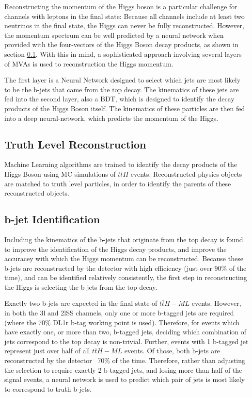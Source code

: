 Reconstructing the momentum of the Higgs boson is a particular challenge for channels with leptons in the final state: Because all channels include at least two neutrinos in the final state, the Higgs can never be fully reconstructed. However, the momentum spectrum can be well predicted by a neural network when provided with the four-vectors of the Higgs Boson decay products, as shown in section \ref{sec:truthLevelReco}. With this in mind, a sophisticated approach involving several layers of MVAs is used to reconstruction the Higgs momentum. 

The first layer is a Neural Network designed to select which jets are most likely to be the b-jets that came from the top decay. The kinematics of these jets are fed into the second layer, also a BDT, which is designed to identify the decay products of the Higgs Boson itself. The kinematics of these particles are then fed into a deep neural-network, which predicts the momentum of the Higgs.

\subsection{Truth Level Reconstruction}
\label{sec:truthLevelReco}

Machine Learning algorithms are trained to identify the decay products of the Higgs Boson using MC simulations of $t\bar{t}H$ events. Reconstructed physics objects are matched to truth level particles, in order to identify the parents of these reconstructed objects. 

\subsection{b-jet Identification}
\label{sec:bjetID}

Including the kinematics of the b-jets that originate from the top decay is found to improve the identification of the Higgs decay products, and improve the accuracey with which the Higgs momentum can be reconstructed. Because these b-jets are reconstructed by the detector with high efficiency (just over 90\% of the time), and can be identified relatively consistently, the first step in reconstructing the Higgs is selecting the b-jets from the top decay.

Exactly two b-jets are expected in the final state of $t\bar{t}H-ML$ events. However, in both the 3l and 2lSS channels, only one or more b-tagged jets are required (where the 70\% DL1r b-tag working point is used). Therefore, for events which have exactly one, or more than two, b-tagged jets, deciding which combination of jets correspond to the top decay is non-trivial. Further, events with 1 b-tagged jet represent just over half of all $t\bar{t}H-ML$ events. Of those, both b-jets are reconstructed by the detector ~70\% of the time. Therefore, rather than adjusting the selection to require exactly 2 b-tagged jets, and losing more than half of the signal events, a neural network is used to predict which pair of jets is most likely to correspond to truth b-jets.


